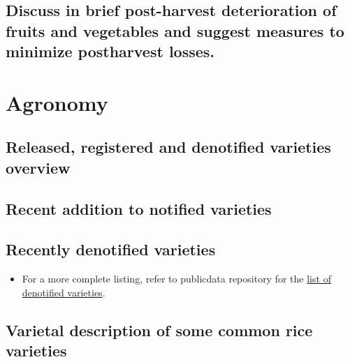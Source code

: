 \documentclass[
]{book}
\providecommand{\tightlist}{%
  \setlength{\itemsep}{0pt}\setlength{\parskip}{0pt}}
\begin{document}
\hypertarget{discuss-in-brief-post-harvest-deterioration-of-fruits-and-vegetables-and-suggest-measures-to-minimize-postharvest-losses.}{%
\section{Discuss in brief post-harvest deterioration of fruits and vegetables and suggest measures to minimize postharvest losses.}\label{discuss-in-brief-post-harvest-deterioration-of-fruits-and-vegetables-and-suggest-measures-to-minimize-postharvest-losses.}}

\hypertarget{agronomy}{%
\chapter{Agronomy}\label{agronomy}}

\hypertarget{released-registered-and-denotified-varieties-overview}{%
\section{Released, registered and denotified varieties overview}\label{released-registered-and-denotified-varieties-overview}}

\hypertarget{recent-addition-to-notified-varieties}{%
\section{Recent addition to notified varieties}\label{recent-addition-to-notified-varieties}}

\hypertarget{recently-denotified-varieties}{%
\section{Recently denotified varieties}\label{recently-denotified-varieties}}

\begin{itemize}
\tightlist
\item
  For a more complete listing, refer to publicdata repository for the \href{https://raw.githubusercontent.com/DeependraD/publicdata/master/crop_varieties/denotified_varieties.csv}{list of denotified varieties}.
\end{itemize}

\hypertarget{varietal-description-of-some-common-rice-varieties}{%
\section{Varietal description of some common rice varieties}\label{varietal-description-of-some-common-rice-varieties}}
\end{document}
